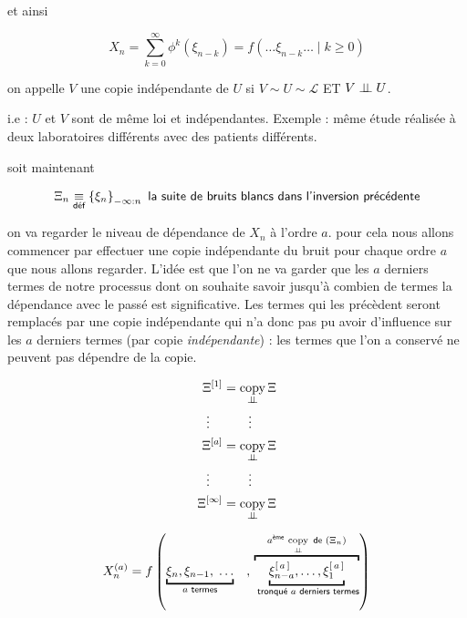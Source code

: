 et ainsi 

$$
\boxed{
    X_n = \sum\limits_{k=0}^\infty \phi^k( \xi_{n-k} ) = f( \dots \xi_{n-k} \dots \; | \; k \geq 0)
}
$$


\begin{definition}
    on appelle $V$ une copie indépendante de $U$ si $V \sim U \sim \mathcal L$ ET $V \perp \!\!\! \perp U$.

    i.e : $U$ et $V$ sont de même loi et indépendantes. Exemple : même étude réalisée à deux laboratoires différents avec des patients différents.
\end{definition}

soit maintenant

$$\Xi_n \underset {\textsf{déf}} {\equiv} \left\{ \xi_n\right\}_{-\infty : n} \textsf{ la suite de bruits blancs dans l'inversion précédente}$$

on va regarder le niveau de dépendance de $X_n$ à l'ordre $a$. pour cela nous allons commencer par effectuer une copie indépendante du bruit pour chaque ordre $a$ que nous allons regarder. L'idée est que l'on ne va garder que les $a$ derniers termes de notre processus dont on souhaite savoir jusqu'à combien de termes la dépendance avec le passé est significative. Les termes qui les précèdent seront remplacés par une copie indépendante qui n'a donc pas pu avoir d'influence sur les $a$ derniers termes (par copie \emph{indépendante}) : les termes que l'on a conservé ne peuvent pas dépendre de la copie.


\begin{minipage}{0.45\textwidth}

\begin{align*}
    \Xi^{[1]} &= \operatornamewithlimits{copy}\limits_{\indep} \Xi
    \\
    \vdots\quad &  \quad\quad \vdots 
    \\
\Xi^{[a]} &= \operatornamewithlimits{copy}\limits_{\indep} \Xi
\\ \vdots\quad &  \quad\quad \vdots 
\\
\Xi^{[\infty]} &= \operatornamewithlimits{copy}\limits_{\indep} \Xi
\end{align*}

\end{minipage}
%
\begin{minipage}{0.45\textwidth}
$$X_n^{(a)} = f\left( 
\underbracket{    
\xi_n, \xi_{n-1}, \; \dots}_
{a \textsf{ termes}} 
\quad , \, 
\overbracket
{\underbracket{\xi_{n-a}^{[\, a \, ]} , \dots , \xi_{1}^{[ \, a \, ]}}_
{\textsf{ tronqué } a \textsf{ derniers termes}}
}^{a^{\textsf{ème}} \, \operatornamewithlimits{copy}\limits_{\indep} \textsf{ de } (\Xi_n)}
\right)$$
\end{minipage}

